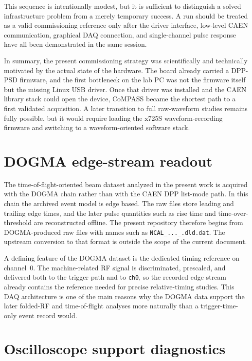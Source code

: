 This sequence is intentionally modest, but it is sufficient to distinguish a solved infrastructure problem from a merely temporary success. A run should be treated as a valid commissioning reference only after the driver interface, low-level CAEN communication, graphical DAQ connection, and single-channel pulse response have all been demonstrated in the same session.

In summary, the present commissioning strategy was scientifically and technically motivated by the actual state of the hardware. The board already carried a DPP-PSD firmware, and the first bottleneck on the lab PC was not the firmware itself but the missing Linux USB driver. Once that driver was installed and the CAEN library stack could open the device, CoMPASS became the shortest path to a first validated acquisition. A later transition to full raw-waveform studies remains fully possible, but it would require loading the x725S waveform-recording firmware and switching to a waveform-oriented software stack.

\section{DOGMA edge-stream readout}

The time-of-flight-oriented beam dataset analyzed in the present work is acquired with the DOGMA chain rather than with the CAEN DPP list-mode path. In this chain the archived event model is edge based. The raw files store leading and trailing edge times, and the later pulse quantities such as rise time and time-over-threshold are reconstructed offline. The present repository therefore begins from DOGMA-produced raw files with names such as \texttt{NCAL\_...\_.dld.dat}. The upstream conversion to that format is outside the scope of the current document.

A defining feature of the DOGMA dataset is the dedicated timing reference on channel~0. The machine-related RF signal is discriminated, prescaled, and delivered both to the trigger path and to \texttt{ch0}, so the recorded edge stream already contains the reference needed for precise relative-timing studies. This DAQ architecture is one of the main reasons why the DOGMA data support the later folded-RF and time-of-flight analyses more naturally than a trigger-time-only event record would.

\section{Oscilloscope support diagnostics}

